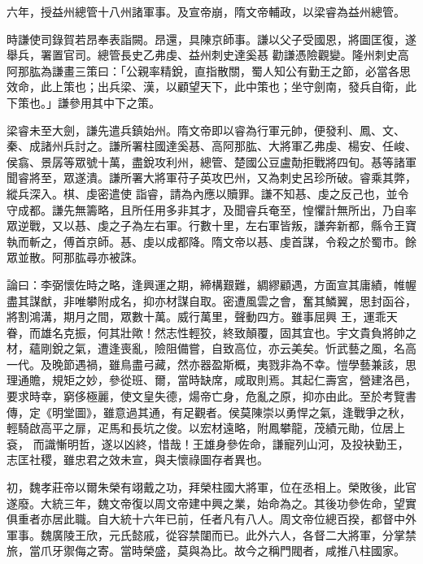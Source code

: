 \begin{pinyinscope}
 六年，授益州總管十八州諸軍事。及宣帝崩，隋文帝輔政，以梁睿為益州總管。



 時謙使司錄賀若昂奉表詣闕。昂還，具陳京師事。謙以父子受國恩，將圖匡復，遂舉兵，署置官司。總管長史乙弗虔、益州刺史達奚惎
 勸謙憑險觀變。隆州刺史高阿那肱為謙畫三策曰：「公親率精銳，直指散關，蜀人知公有勤王之節，必當各思效命，此上策也；出兵梁、漢，以顧望天下，此中策也；坐守劍南，發兵自衛，此下策也。」謙參用其中下之策。



 梁睿未至大劍，謙先遣兵鎮始州。隋文帝即以睿為行軍元帥，便發利、鳳、文、秦、成諸州兵討之。謙所署柱國達奚惎、高阿那肱、大將軍乙弗虔、楊安、任峻、侯翕、景孱等眾號十萬，盡銳攻利州，總管、楚國公豆盧勣拒戰將四旬。惎等諸軍聞睿將至，眾遂潰。謙所署大將軍苻子英攻巴州，又為刺史呂珍所破。睿乘其弊，縱兵深入。棋、虔密遣使
 詣睿，請為內應以贖罪。謙不知惎、虔之反己也，並令守成都。謙先無籌略，且所任用多非其才，及聞睿兵奄至，惶懼計無所出，乃自率眾逆戰，又以惎、虔之子為左右軍。行數十里，左右軍皆叛，謙奔新都，縣令王寶執而斬之，傅首京師。惎、虔以成都降。隋文帝以惎、虔首謀，令殺之於蜀市。餘眾並散。阿那肱尋亦被誅。



 論曰：李弼懷佐時之略，逢興運之期，締構艱難，綢繆顧遇，方面宣其庸績，帷幄盡其謀猷，非唯攀附成名，抑亦材謀自取。密遭風雲之會，奮其鱗翼，思封函谷，將割鴻溝，期月之間，眾數十萬。威行萬里，聲動四方。雖事屈興
 王，運乖天眷，而雄名克振，何其壯歟！然志性輕狡，終致顛覆，固其宜也。宇文貴負將帥之材，蘊剛銳之氣，遭逢喪亂，險阻備嘗，自致高位，亦云美矣。忻武藝之風，名高一代。及晚節遇禍，雖鳥盡弓藏，然亦器盈斯概，夷戮非為不幸。愷學藝兼該，思理通贍，規矩之妙，參從班、爾，當時缺席，咸取則焉。其起仁壽宮，營建洛邑，要求時幸，窮侈極麗，使文皇失德，煬帝亡身，危亂之原，抑亦由此。至於考覽書傳，定《明堂圖》，雖意過其通，有足觀者。侯莫陳崇以勇悍之氣，逢戰爭之秋，輕騎啟高平之扉，疋馬和長坑之俊。以宏材遠略，附鳳攀龍，茂績元勛，位居上袞，
 而識慚明哲，遂以凶終，惜哉！王雄身參佐命，謙寵列山河，及投袂勤王，志匡社稷，雖忠君之效未宣，與夫懷祿圖存者異也。



 初，魏孝莊帝以爾朱榮有翊戴之功，拜榮柱國大將軍，位在丞相上。榮敗後，此官遂廢。大統三年，魏文帝復以周文帝建中興之業，始命為之。其後功參佐命，望實俱重者亦居此職。自大統十六年已前，任者凡有八人。周文帝位總百揆，都督中外軍事。魏廣陵王欣，元氏懿戚，從容禁闥而已。此外六人，各督二大將軍，分掌禁旅，當爪牙禦侮之寄。當時榮盛，莫與為比。故今之稱門閥者，咸推八柱國家。




\end{pinyinscope}
